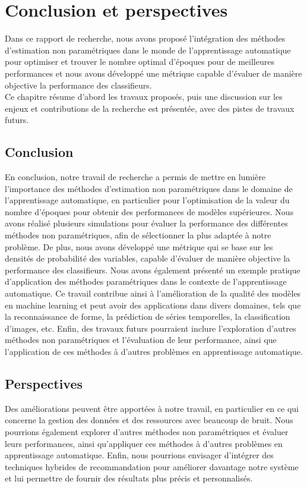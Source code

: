 \chapter*{Conclusion et perspectives}
\label{sec:conclusion}

Dans ce rapport de recherche, nous avons proposé l'intégration des méthodes d'estimation non paramétriques dans le monde de l'apprentissage automatique pour optimiser et trouver le nombre optimal d'époques pour de meilleures performances et nous avons développé une métrique capable d'évaluer de manière objective la performance des classifieurs.\\
Ce chapitre résume d'abord les travaux proposés, puis une discussion sur les enjeux et contributions de la recherche est présentée, avec des pistes de travaux futurs.
\section*{Conclusion}
En conclusion, notre travail de recherche a permis de mettre en lumière l'importance des méthodes d'estimation non paramétriques dans le domaine de l'apprentissage automatique, en particulier pour l'optimisation de la valeur du nombre d'époques pour obtenir des performances de modèles supérieures. Nous avons réalisé plusieurs simulations pour évaluer la performance des différentes méthodes non paramétriques, afin de sélectionner la plus adaptée à notre problème. De plus, nous avons développé une métrique qui se base sur les densités de probabilité des variables, capable d'évaluer de manière objective la performance des classifieurs.
\setlength{\parindent}{0pt}
Nous avons également présenté un exemple pratique d'application des méthodes paramétriques dans le contexte de l'apprentissage automatique. Ce travail contribue ainsi à l'amélioration de la qualité des modèles en machine learning et peut avoir des applications dans divers domaines, tels que la reconnaissance de forme, la prédiction de séries temporelles, la classification d'images, etc. Enfin, des travaux futurs pourraient inclure l'exploration d'autres méthodes non paramétriques et l'évaluation de leur performance, ainsi que l'application de ces méthodes à d'autres problèmes en apprentissage automatique.
\section*{Perspectives}
 Des améliorations peuvent être apportées à notre travail, en particulier en ce qui concerne la gestion des données et des ressources avec beaucoup de bruit. Nous pourrions également explorer d'autres méthodes non paramétriques et évaluer leurs performances, ainsi qu'appliquer ces méthodes à d'autres problèmes en apprentissage automatique.
\setlength{\parindent}{0pt}
 Enfin, nous pourrions envisager d'intégrer des techniques hybrides de recommandation pour améliorer davantage notre système et lui permettre de fournir des résultats plus précis et personnalisés.


